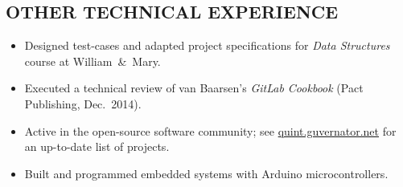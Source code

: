 \documentclass{res}     %
\begin{document}
\begin{resume}
\section{OTHER TECHNICAL EXPERIENCE}
\vspace{5mm}
\begin{itemize}[leftmargin=5mm]
\item Designed test-cases and adapted project specifications for \emph{Data Structures} course at William~\&~Mary.
\item Executed a technical review of van Baarsen's \emph{GitLab Cookbook} (Pact Publishing, Dec.\ 2014).
\item Active in the open-source software community; see \url{quint.guvernator.net} for an up-to-date list of projects.
\item Built and programmed embedded systems with Arduino microcontrollers.
\end{itemize}



\end{resume}
\end{document}
